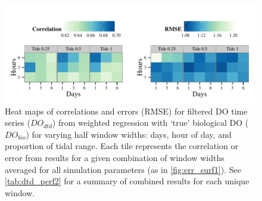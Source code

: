 \documentclass[letterpaper,12pt,oneside]{article}\usepackage[]{graphicx}\usepackage[]{color}
\makeatletter
\def\maxwidth{ %
  \ifdim\Gin@nat@width>\linewidth
    \linewidth
  \else
    \Gin@nat@width
  \fi
}
\newenvironment{knitrout}{}{} %
\makeatother
\begin{document}
\centering\vspace*{\fill}
\begin{knitrout}
\color{fgcolor}\begin{figure}[!ht]


{\centering \includegraphics[width=\maxwidth]{figure/err_surf2} 

}

\caption[Heat maps of correlations and errors (\ac{RMSE}) for filtered \ac{DO} time series ($DO_{dtd}$) from weighted regression with `true' biological \ac{DO} ($DO_{bio}$) for varying half window widths]{Heat maps of correlations and errors (\ac{RMSE}) for filtered \ac{DO} time series ($DO_{dtd}$) from weighted regression with `true' biological \ac{DO} ($DO_{bio}$) for varying half window widths: days, hour of day, and proportion of tidal range.  Each tile represents the correlation or error from results for a given combination of window widths averaged for all simulation parameters (as in \cref{fig:err_surf1}).  See \cref{tab:dtd_perf2} for a summary of combined results for each unique window.\label{fig:err_surf2}}
\end{figure}


\end{knitrout}
\vfill
\clearpage
\end{document}
